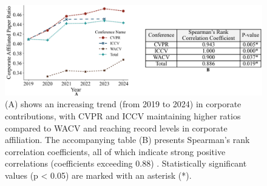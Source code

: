 \documentclass{article}
\begin{document}
\begin{figure}[ht]
    \centering
    \includegraphics[width=0.9\linewidth]{report/images/corporate_ratio_table.png}
    \vspace{-5pt}
    \caption{(A) shows an increasing trend (from 2019 to 2024) in corporate contributions, with CVPR and ICCV maintaining higher ratios compared to WACV and reaching record levels in corporate affiliation. The accompanying table (B) presents Spearman’s rank correlation coefficients, all of which indicate strong positive correlations (coefficients exceeding 0.88) . Statistically significant values (p < 0.05) are marked with an asterisk (*).}
    \label{fig:corporate_ratio_graph}
\end{figure}
\vspace{-17pt}
\end{document}

